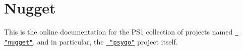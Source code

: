 \chapter{Nugget}
\hypertarget{index}{}\label{index}
This is the online documentation for the PS1 collection of projects named \href{https://github.com/pcsx-redux/nugget/blob/main/doc/README.md}{\texttt{ "{}nugget"{}}}, and in particular, the \href{https://github.com/pcsx-redux/nugget/tree/main/psyqo\#psyqo}{\texttt{ "{}psyqo"{}}} project itself. 
